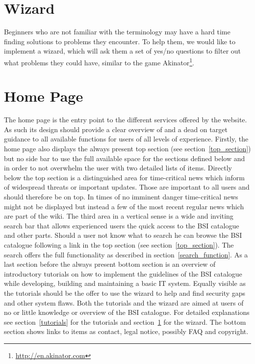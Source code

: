 \section{Wizard}
\label{wizard}
Beginners who are not familiar with the terminology may have a hard time finding solutions to problems they encounter. 
To help them, we would like to implement a wizard, which will ask them a set of yes/no questions to filter out what problems they could have, similar to the game Akinator\footnote{\url{http://en.akinator.com}}. 
 
\section{Home Page}
The home page is the entry point to the different services offered by the website. 
As such its design should provide a clear overview of and a dead on target guidance to all available functions for users of all levels of experience.
Firstly, the home page also displays the always present top section (see section~\ref{top_section}) but no side bar to use the full available space for the sections defined below and in order to not overwhelm the user with two detailed lists of items.
Directly below the top section is a distinguished area for time-critical news which inform of widespread threats or important updates.
Those are important to all users and should therefore be on top.
In times of no imminent danger time-critical news might not be displayed but instead a few of the most recent regular news which are part of the wiki.
The third area in a vertical sense is a wide and inviting search bar that allows experienced users the quick access to the BSI catalogue and other parts. 
Should a user not know what to search he can browse the BSI catalogue following a link in the top section (see section~\ref{top_section}).
The search offers the full functionality as described in section~\ref{search_function}.
As a last section before the always present bottom section is an overview of introductory tutorials on how to implement the guidelines of the BSI catalogue while developing, building and maintaining a basic IT system.
Equally visible as the tutorials should be the offer to use the wizard to help and find security gaps and other system flaws.
Both the tutorials and the wizard are aimed at users of no or little knowledge or overview of the BSI catalogue.
For detailed explanations see section~\ref{tutorials} for the tutorials and section~\ref{wizard} for the wizard.
The bottom section shows links to items as contact, legal notice, possibly FAQ and copyright.

